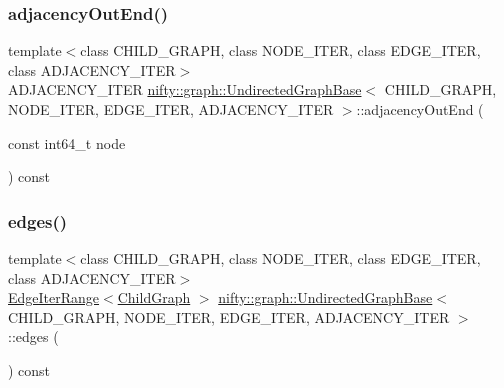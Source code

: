 \mbox{\label{classnifty_1_1graph_1_1UndirectedGraphBase_a074b4246bb62d8f6e57d913126709831}} 
\subsubsection{\texorpdfstring{adjacency\+Out\+End()}{adjacencyOutEnd()}}
{\footnotesize\ttfamily template$<$class C\+H\+I\+L\+D\+\_\+\+G\+R\+A\+PH, class N\+O\+D\+E\+\_\+\+I\+T\+ER, class E\+D\+G\+E\+\_\+\+I\+T\+ER, class A\+D\+J\+A\+C\+E\+N\+C\+Y\+\_\+\+I\+T\+ER$>$ \\
A\+D\+J\+A\+C\+E\+N\+C\+Y\+\_\+\+I\+T\+ER \hyperlink{classnifty_1_1graph_1_1UndirectedGraphBase}{nifty\+::graph\+::\+Undirected\+Graph\+Base}$<$ C\+H\+I\+L\+D\+\_\+\+G\+R\+A\+PH, N\+O\+D\+E\+\_\+\+I\+T\+ER, E\+D\+G\+E\+\_\+\+I\+T\+ER, A\+D\+J\+A\+C\+E\+N\+C\+Y\+\_\+\+I\+T\+ER $>$\+::adjacency\+Out\+End (\begin{DoxyParamCaption}\item[{const int64\+\_\+t}]{node }\end{DoxyParamCaption}) const\hspace{0.3cm}{\ttfamily [inline]}}

\mbox{\label{classnifty_1_1graph_1_1UndirectedGraphBase_ace8277ea99ae46b11bf9070955abf846}} 
\subsubsection{\texorpdfstring{edges()}{edges()}}
{\footnotesize\ttfamily template$<$class C\+H\+I\+L\+D\+\_\+\+G\+R\+A\+PH, class N\+O\+D\+E\+\_\+\+I\+T\+ER, class E\+D\+G\+E\+\_\+\+I\+T\+ER, class A\+D\+J\+A\+C\+E\+N\+C\+Y\+\_\+\+I\+T\+ER$>$ \\
\hyperlink{structnifty_1_1graph_1_1UndirectedGraphBase_1_1EdgeIterRange}{Edge\+Iter\+Range}$<$\hyperlink{classnifty_1_1graph_1_1UndirectedGraphBase_af2541cf9fb91440ff0a7b56dd5a6be29}{Child\+Graph} $>$ \hyperlink{classnifty_1_1graph_1_1UndirectedGraphBase}{nifty\+::graph\+::\+Undirected\+Graph\+Base}$<$ C\+H\+I\+L\+D\+\_\+\+G\+R\+A\+PH, N\+O\+D\+E\+\_\+\+I\+T\+ER, E\+D\+G\+E\+\_\+\+I\+T\+ER, A\+D\+J\+A\+C\+E\+N\+C\+Y\+\_\+\+I\+T\+ER $>$\+::edges (\begin{DoxyParamCaption}{ }\end{DoxyParamCaption}) const\hspace{0.3cm}{\ttfamily [inline]}}

